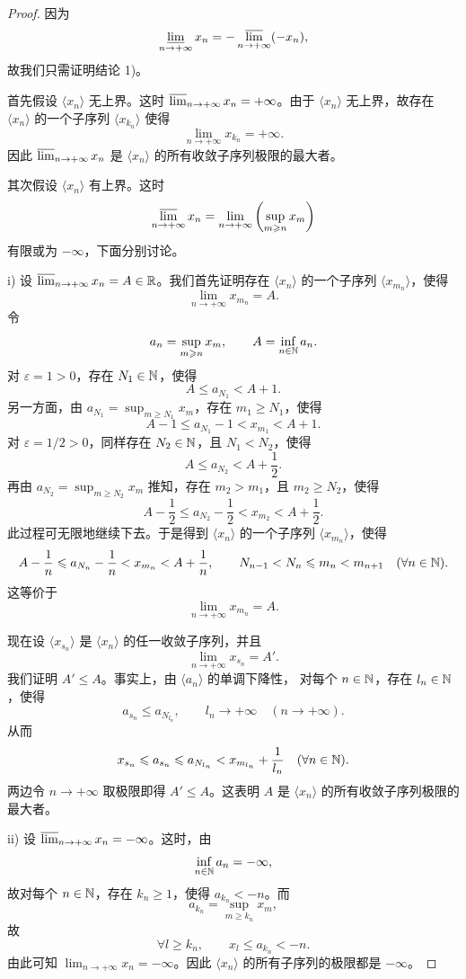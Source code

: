 \begin{proof}
因为
\[
\varliminf_{n\to+\infty}x_n
=-\varlimsup_{n\to+\infty}(-x_n),
\]
故我们只需证明结论 1)。

首先假设 \(\langle x_n\rangle\) 无上界。这时
\(\varlimsup_{n\to+\infty}x_n=+\infty\)。由于
\(\langle x_n\rangle\) 无上界，故存在 \(\langle x_n\rangle\) 的一个子序列
\(\langle x_{k_n}\rangle\) 使得
\[
\lim_{n\to+\infty}x_{k_n}=+\infty.
\]
因此 \(\varlimsup_{n\to+\infty}x_n\) 是
\(\langle x_n\rangle\) 的所有收敛子序列极限的最大者。

其次假设 \(\langle x_n\rangle\) 有上界。这时
\[
\varlimsup_{n\to+\infty}x_n
=\lim_{n\to+\infty}\left(\sup_{m\geqslant n}x_m\right)
\]
有限或为 \(-\infty\)，下面分别讨论。

i) 设 \(\varlimsup_{n\to+\infty}x_n=A\in\mathbb{R}\)。我们首先证明存在
\(\langle x_n\rangle\) 的一个子序列 \(\langle x_{m_n}\rangle\)，使得
\[
\lim_{n\to+\infty}x_{m_n}=A.
\]
令
\[
a_n=\sup_{m\geqslant n}x_m,\qquad
A=\inf_{n\in\mathbb{N}}a_n.
\]
对 \(\varepsilon=1>0\)，存在 \(N_1\in\mathbb{N}\)，使得
\[
A\leqslant a_{N_1}<A+1.
\]
另一方面，由
\(a_{N_1}=\sup_{m\geqslant N_1}x_m\)，存在 \(m_1\geqslant N_1\)，使得
\[
A-1\leqslant a_{N_1}-1<x_{m_1}<A+1.
\]
对 \(\varepsilon=1/2>0\)，同样存在 \(N_2\in\mathbb{N}\)，且
\(N_1<N_2\)，使得
\[
A\leqslant a_{N_2}<A+\frac12.
\]
再由 \(a_{N_2}=\sup_{m\geqslant N_2}x_m\) 推知，存在
\(m_2>m_1\)，且 \(m_2\geqslant N_2\)，使得
\[
A-\frac12\leqslant a_{N_2}-\frac12<x_{m_2}<A+\frac12.
\]
此过程可无限地继续下去。于是得到 \(\langle x_n\rangle\) 的一个子序列
\(\langle x_{m_n}\rangle\)，使得
\[
A-\frac1n\leqslant a_{N_n}-\frac1n<x_{m_n}<A+\frac1n,
\qquad
N_{n-1}<N_n\leqslant m_n<m_{n+1}\quad(\forall n\in\mathbb{N}).
\]
这等价于
\[
\lim_{n\to+\infty}x_{m_n}=A.
\]

现在设 \(\langle x_{s_n}\rangle\) 是 \(\langle x_n\rangle\) 的任一收敛子序列，并且
\[
\lim_{n\to+\infty}x_{s_n}=A'.
\]
我们证明 \(A'\leqslant A\)。事实上，由 \(\langle a_n\rangle\) 的单调下降性，
对每个 \(n\in\mathbb{N}\)，存在 \(l_n\in\mathbb{N}\)，使得
\[
a_{s_n}\leqslant a_{N_{l_n}},\qquad l_n\to+\infty\quad(n\to+\infty).
\]
从而
\[
x_{s_n}\leqslant a_{s_n}\leqslant a_{N_{l_n}}
<x_{m_{l_n}}+\frac1{l_n}\quad(\forall n\in\mathbb{N}).
\]
两边令 \(n\to+\infty\) 取极限即得 \(A'\leqslant A\)。这表明
\(A\) 是 \(\langle x_n\rangle\) 的所有收敛子序列极限的最大者。

ii) 设 \(\varlimsup_{n\to+\infty}x_n=-\infty\)。这时，由
\[
\inf_{n\in\mathbb{N}}a_n=-\infty,
\]
故对每个 \(n\in\mathbb{N}\)，存在 \(k_n\geqslant1\)，使得
\(a_{k_n}<-n\)。而
\[
a_{k_n}=\sup_{m\geqslant k_n}x_m,
\]
故
\[
\forall l\geqslant k_n,\qquad x_l\leqslant a_{k_n}<-n.
\]
由此可知 \(\lim_{n\to+\infty}x_n=-\infty\)。因此
\(\langle x_n\rangle\) 的所有子序列的极限都是 \(-\infty\)。
\end{proof}

